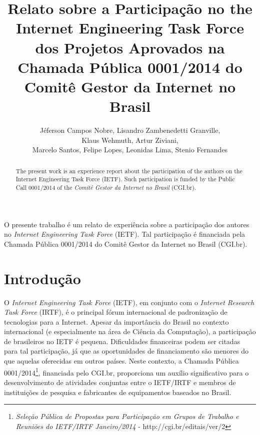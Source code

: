 \documentclass[12pt]{article}
\title{Relato sobre a Participação no the Internet Engineering Task Force dos Projetos Aprovados na Chamada Pública 0001/2014 do Comitê Gestor da Internet no Brasil}
\author{J{\'e}ferson Campos Nobre\inst{1}, Lisandro Zambenedetti Granville\inst{1},\\ Klaus Wehmuth\inst{2}, Artur Ziviani\inst{2},\\ Marcelo Santos\inst{3}, Felipe Lopes\inst{3}, Leonidas Lima\inst{3}, Stenio Fernandes\inst{3}}
\begin{document}
 

\maketitle

\begin{abstract}

The present work is an experience report about the participation of the authors on the Internet Engineering Task Force (IETF). Such participation is funded by the Public Call 0001/2014 of the \textit{Comitê Gestor da Internet no Brasil} (CGI.br).

\end{abstract}

\begin{resumo}

O presente trabalho é um relato de experiência sobre a participação dos autores no \textit{Internet Engineering Task Force} (IETF). Tal participação é financiada pela Chamada Pública 0001/2014 do Comitê Gestor da Internet no Brasil (CGI.br).

\end{resumo}

\section{Introdução}


O \textit{Internet Engineering Task Force} (IETF), em conjunto com o \textit{Internet Research Task Force} (IRTF), é o principal fórum internacional de padronização de tecnologias para a Internet. Apesar da importância do Brasil no contexto internacional (e especialmente na área de Ciência da Computação), a participação de brasileiros no IETF é pequena. Dificuldades financeiras podem ser citadas para tal participação, já que as oportunidades de financiamento são menores do que aquelas oferecidas em outros países. Neste contexto, a Chamada Pública 0001/2014\footnote{\textit{Seleção Pública de Propostas para Participação em Grupos de Trabalho e Reuniões do IETF/IRTF Janeiro/2014} - http://cgi.br/editais/ver/2}, financiada pelo CGI.br, proporciona um auxílio significativo para o desenvolvimento de atividades conjuntas entre o IETF/IRTF e membros de instituições de pesquisa e fabricantes de equipamentos baseados no Brasil.

%
\end{document}
